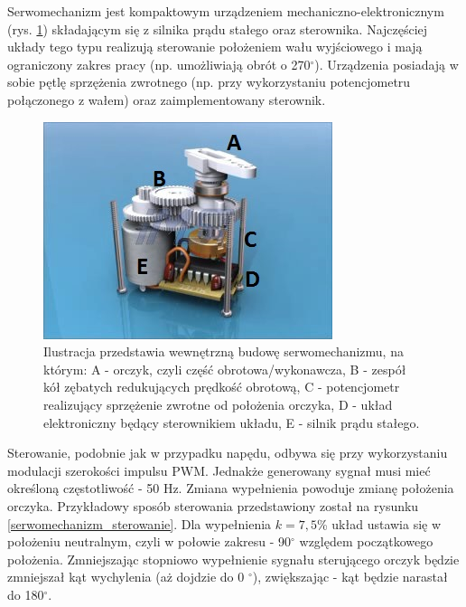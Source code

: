 Serwomechanizm jest kompaktowym urządzeniem mechaniczno-elektronicznym (rys. \ref{serwomechanizm}) składającym się z silnika prądu stałego oraz sterownika. Najczęściej układy tego typu realizują sterowanie położeniem wału wyjściowego i mają ograniczony zakres pracy (np. umożliwiają obrót o 270$^\circ$). Urządzenia posiadają w sobie pętlę sprzężenia zwrotnego (np. przy wykorzystaniu potencjometru połączonego z wałem) oraz zaimplementowany sterownik. 
  \begin{figure}[H]
    \begin{center}
      \includegraphics[scale=0.7]{imgs/serwo.jpg}
 	\caption[Model serwomechanizmu.]{\small{Ilustracja przedstawia wewnętrzną budowę serwomechanizmu, na którym: A - orczyk, czyli część obrotowa/wykonawcza, B - zespół kół zębatych redukujących prędkość obrotową, C - potencjometr realizujący sprzężenie zwrotne od położenia orczyka, D - układ elektroniczny będący sterownikiem układu, E - silnik prądu stałego.}\footnotemark}
	\label{serwomechanizm}
    \end{center}
  \end{figure}  
\noindent
Sterowanie, podobnie jak w przypadku napędu, odbywa się przy wykorzystaniu modulacji szerokości impulsu PWM. Jednakże generowany sygnał musi mieć określoną częstotliwość - 50 Hz. Zmiana wypełnienia powoduje zmianę położenia orczyka. Przykładowy sposób sterowania przedstawiony został na rysunku \ref{serwomechanizm_sterowanie}. Dla wypełnienia $k=7,5$\% układ ustawia się w położeniu neutralnym, czyli w połowie zakresu - 90$^\circ$ względem początkowego położenia. Zmniejszając stopniowo wypełnienie sygnału sterującego orczyk będzie zmniejszał kąt wychylenia (aż dojdzie do 0 $^\circ$), zwiększając - kąt będzie narastał do 180$^\circ$.
